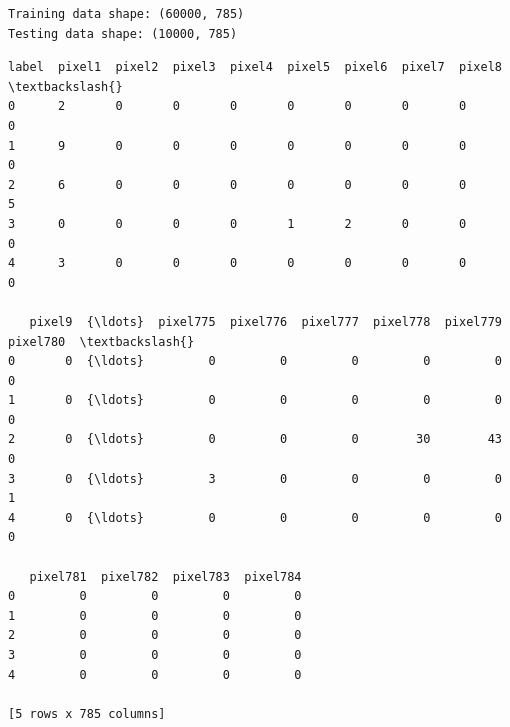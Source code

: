 \documentclass[11pt]{article}
\begin{document}
    \begin{Verbatim}[commandchars=\\\{\}]
Training data shape: (60000, 785)
Testing data shape: (10000, 785)
    \end{Verbatim}

    
    \begin{Verbatim}[commandchars=\\\{\}]
   label  pixel1  pixel2  pixel3  pixel4  pixel5  pixel6  pixel7  pixel8  \textbackslash{}
0      2       0       0       0       0       0       0       0       0   
1      9       0       0       0       0       0       0       0       0   
2      6       0       0       0       0       0       0       0       5   
3      0       0       0       0       1       2       0       0       0   
4      3       0       0       0       0       0       0       0       0   

   pixel9  {\ldots}  pixel775  pixel776  pixel777  pixel778  pixel779  pixel780  \textbackslash{}
0       0  {\ldots}         0         0         0         0         0         0   
1       0  {\ldots}         0         0         0         0         0         0   
2       0  {\ldots}         0         0         0        30        43         0   
3       0  {\ldots}         3         0         0         0         0         1   
4       0  {\ldots}         0         0         0         0         0         0   

   pixel781  pixel782  pixel783  pixel784  
0         0         0         0         0  
1         0         0         0         0  
2         0         0         0         0  
3         0         0         0         0  
4         0         0         0         0  

[5 rows x 785 columns]
    \end{Verbatim}
\end{document}
